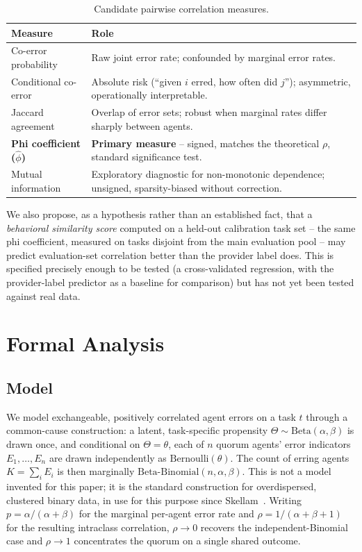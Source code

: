 \documentclass[journal]{IEEEtran}
\begin{document}
\begin{table}[t]
\centering
\caption{Candidate pairwise correlation measures.}
\label{tab:measures}
\small
\begin{tabular}{@{}p{2.1cm}p{5.6cm}@{}}
\toprule
\textbf{Measure} & \textbf{Role} \\
\midrule
Co-error probability & Raw joint error rate; confounded by marginal error rates. \\
Conditional co-error & Absolute risk (``given $i$ erred, how often did $j$''); asymmetric, operationally interpretable. \\
Jaccard agreement & Overlap of error sets; robust when marginal rates differ sharply between agents. \\
\textbf{Phi coefficient ($\hat\phi$)} & \textbf{Primary measure} -- signed, matches the theoretical $\rho$, standard significance test. \\
Mutual information & Exploratory diagnostic for non-monotonic dependence; unsigned, sparsity-biased without correction. \\
\bottomrule
\end{tabular}
\end{table}

We also propose, as a hypothesis rather than an established fact, that a \emph{behavioral similarity score} computed on a held-out calibration task set -- the same phi coefficient, measured on tasks disjoint from the main evaluation pool -- may predict evaluation-set correlation better than the provider label does. This is specified precisely enough to be tested (a cross-validated regression, with the provider-label predictor as a baseline for comparison) but has not yet been tested against real data.

\section{Formal Analysis}
\label{sec:formal}

\subsection{Model}

We model exchangeable, positively correlated agent errors on a task $t$ through a common-cause construction: a latent, task-specific propensity $\Theta \sim \mathrm{Beta}(\alpha,\beta)$ is drawn once, and conditional on $\Theta=\theta$, each of $n$ quorum agents' error indicators $E_1,\ldots,E_n$ are drawn independently as $\mathrm{Bernoulli}(\theta)$. The count of erring agents $K=\sum_i E_i$ is then marginally $\mathrm{Beta\text{-}Binomial}(n,\alpha,\beta)$. This is not a model invented for this paper; it is the standard construction for overdispersed, clustered binary data, in use for this purpose since Skellam~\cite{skellam1948}. Writing $p=\alpha/(\alpha+\beta)$ for the marginal per-agent error rate and $\rho = 1/(\alpha+\beta+1)$ for the resulting intraclass correlation, $\rho \to 0$ recovers the independent-Binomial case and $\rho \to 1$ concentrates the quorum on a single shared outcome.
\end{document}
